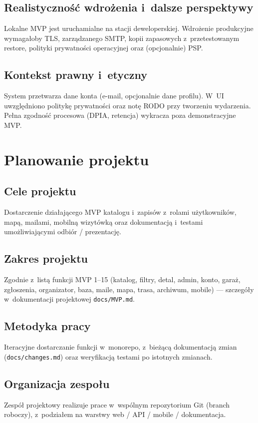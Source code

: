 \documentclass{sprz}
\begin{document}
\section{Realistyczność wdrożenia i~dalsze perspektywy}
Lokalne MVP jest uruchamialne na stacji deweloperskiej. Wdrożenie produkcyjne wymagałoby TLS, zarządzanego SMTP, kopii zapasowych z~przetestowanym restore, polityki prywatności operacyjnej oraz (opcjonalnie) PSP.

\section{Kontekst prawny i~etyczny}
System przetwarza dane konta (e-mail, opcjonalnie dane profilu). W~UI uwzględniono politykę prywatności oraz notę RODO przy tworzeniu wydarzenia. Pełna zgodność procesowa (DPIA, retencja) wykracza poza demonstracyjne MVP.

\chapter{Planowanie projektu}
\section{Cele projektu}
Dostarczenie działającego MVP katalogu i~zapisów z~rolami użytkowników, mapą, mailami, mobilną wizytówką oraz dokumentacją i~testami umożliwiającymi odbiór / prezentację.

\section{Zakres projektu}
Zgodnie z~listą funkcji MVP 1--15 (katalog, filtry, detal, admin, konto, garaż, zgłoszenia, organizator, baza, maile, mapa, trasa, archiwum, mobile) --- szczegóły w~dokumentacji projektowej \texttt{docs/MVP.md}.

\section{Metodyka pracy}
Iteracyjne dostarczanie funkcji w~monorepo, z~bieżącą dokumentacją zmian (\texttt{docs/changes.md}) oraz weryfikacją testami po istotnych zmianach.

\section{Organizacja zespołu}
Zespół projektowy realizuje prace w~wspólnym repozytorium Git (branch roboczy), z~podziałem na warstwy web / API / mobile / dokumentacja.
\end{document}
